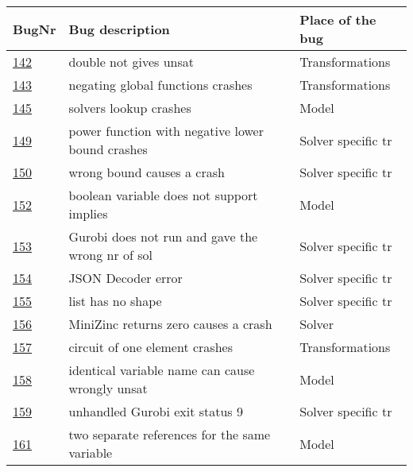 \begin{table}[]
	\centering
	\begin{tabular}{lll}
		BugNr & Bug description                                         & Place of the bug \\ \toprule
		\href{https://github.com/CPMpy/cpmpy/issues/142}{142} & double not gives unsat                            & Transformations     \\
		\href{https://github.com/CPMpy/cpmpy/issues/143}{143} & negating global functions crashes                 & Transformations     \\
		\href{https://github.com/CPMpy/cpmpy/issues/145}{145} & solvers lookup crashes                            & Model              \\
		\href{https://github.com/CPMpy/cpmpy/issues/149}{149} & power function with negative lower bound crashes  & Solver specific tr \\
		\href{https://github.com/CPMpy/cpmpy/issues/150}{150} & wrong bound causes a crash                  & Solver specific tr \\
		\href{https://github.com/CPMpy/cpmpy/issues/152}{152} & boolean variable does not support implies         & Model              \\
		\href{https://github.com/CPMpy/cpmpy/issues/153}{153} & Gurobi does not run and gave the wrong nr of sol  & Solver specific tr \\
		\href{https://github.com/CPMpy/cpmpy/issues/154}{154} & JSON Decoder error                                & Solver specific tr \\
		\href{https://github.com/CPMpy/cpmpy/issues/155}{155} & list has no shape                                 & Solver specific tr \\
		\href{https://github.com/CPMpy/cpmpy/issues/156}{156} & MiniZinc returns zero causes a crash              & Solver             \\
		\href{https://github.com/CPMpy/cpmpy/issues/157}{157} & circuit of one element crashes                    & Transformations     \\
		\href{https://github.com/CPMpy/cpmpy/issues/158}{158} & identical variable name can cause wrongly unsat   & Model              \\
		\href{https://github.com/CPMpy/cpmpy/issues/159}{159} & unhandled Gurobi exit status 9                    & Solver specific tr \\
		\href{https://github.com/CPMpy/cpmpy/issues/161}{161} & two separate references for the same variable     & Model              \\

\end{tabular}
\end{table}
